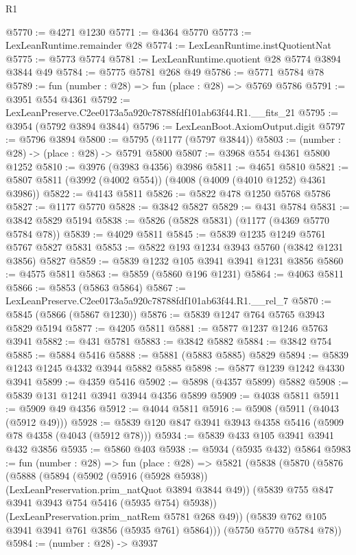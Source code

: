\begin{lexlean}{R1}
\begin{coremodule}
@5770 := @4271 @1230
@5771 := @4364 @5770
@5773 := LexLeanRuntime.remainder @28
@5774 := LexLeanRuntime.instQuotientNat
@5775 := @5773 @5774
@5781 := LexLeanRuntime.quotient @28 @5774 @3894 @3844 @49
@5784 := @5775 @5781 @268 @49
@5786 := @5771 @5784 @78
@5789 := fun (number : @28) => fun (place : @28) => @5769 @5786
@5791 := @3951 @554 @4361
@5792 := LexLeanPreserve.C2ee0173a5a920c78788fdf101ab63f44.R1.__fits_21
@5795 := @3954 (@5792 @3894 @3844)
@5796 := LexLeanBoot.AxiomOutput.digit
@5797 := @5796 @3894
@5800 := @5795 (@1177 (@5797 @3844))
@5803 := (number : @28) -> (place : @28) -> @5791 @5800
@5807 := @3968 @554 @4361 @5800 @1252
@5810 := @3976 (@3983 @4356) @3986
@5811 := @4651 @5810
@5821 := @5807 @5811 (@3992 (@4002 @554)) (@4008 (@4009 (@4010 @1252) @4361 @3986))
@5822 := @4143 @5811
@5826 := @5822 @478 @1250 @5768 @5786
@5827 := @1177 @5770
@5828 := @3842 @5827
@5829 := @431 @5784
@5831 := @3842 @5829 @5194
@5838 := @5826 (@5828 @5831) (@1177 (@4369 @5770 @5784 @78))
@5839 := @4029 @5811
@5845 := @5839 @1235 @1249 @5761 @5767 @5827 @5831
@5853 := @5822 @193 @1234 @3943 @5760 (@3842 @1231 @3856) @5827
@5859 := @5839 @1232 @105 @3941 @3941 @1231 @3856
@5860 := @4575 @5811
@5863 := @5859 (@5860 @196 @1231)
@5864 := @4063 @5811
@5866 := @5853 (@5863 @5864)
@5867 := LexLeanPreserve.C2ee0173a5a920c78788fdf101ab63f44.R1.__rel_7
@5870 := @5845 (@5866 (@5867 @1230))
@5876 := @5839 @1247 @764 @5765 @3943 @5829 @5194
@5877 := @4205 @5811
@5881 := @5877 @1237 @1246 @5763 @3941
@5882 := @431 @5781
@5883 := @3842 @5882
@5884 := @3842 @754
@5885 := @5884 @5416
@5888 := @5881 (@5883 @5885) @5829
@5894 := @5839 @1243 @1245 @4332 @3944 @5882 @5885
@5898 := @5877 @1239 @1242 @4330 @3941
@5899 := @4359 @5416
@5902 := @5898 (@4357 @5899) @5882
@5908 := @5839 @131 @1241 @3941 @3944 @4356 @5899
@5909 := @4038 @5811
@5911 := @5909 @49 @4356
@5912 := @4044 @5811
@5916 := @5908 (@5911 (@4043 (@5912 @49)))
@5928 := @5839 @120 @847 @3941 @3943 @4358 @5416 (@5909 @78 @4358 (@4043 (@5912 @78)))
@5934 := @5839 @433 @105 @3941 @3941 @432 @3856
@5935 := @5860 @403
@5938 := @5934 (@5935 @432) @5864
@5983 := fun (number : @28) =>
  fun (place : @28) =>
  @5821
    (@5838
      (@5870
        (@5876
          (@5888
            (@5894
              (@5902 (@5916 (@5928 @5938)) (LexLeanPreservation.prim_natQuot @3894 @3844 @49))
              (@5839 @755 @847 @3941 @3943 @754 @5416 (@5935 @754) @5938))
            (LexLeanPreservation.prim_natRem @5781 @268 @49))
          (@5839 @762 @105 @3941 @3941 @761 @3856 (@5935 @761) @5864)))
      (@5750 @5770 @5784 @78))
@5984 := (number : @28) -> @3937

\end{coremodule}
\end{lexlean}
